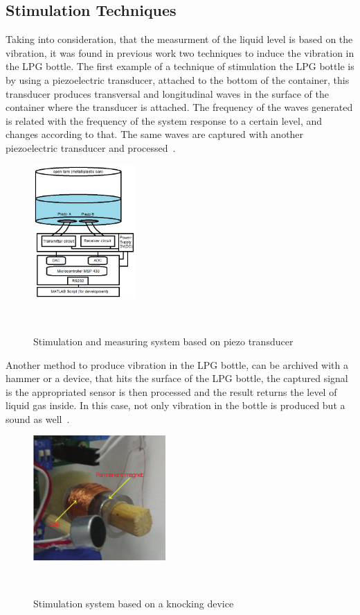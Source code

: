 \subsection{Stimulation Techniques}
Taking into consideration, that the measurment of the liquid level is based on the vibration, it was found in previous work two techniques to induce the vibration in the LPG bottle.
The first example of a technique of stimulation the LPG bottle is by using a piezoelectric transducer, attached to the bottom of the container, this transducer produces transversal and longitudinal waves in the surface of the container where the transducer is attached. The frequency of the waves generated is related with the frequency of the system response to a certain level, and changes according to that. The same waves are captured with another piezoelectric transducer and processed~\cite{jahnLevelSensorFluids2014a}.
\begin{figure}[]
    \centering
    \includegraphics[width=0.35\textwidth]{Chapters/2CHP/Diagrams/stimPiezo.eps}
    \caption{Stimulation and measuring system based on piezo transducer}{~\cite{jahnLevelSensorFluids2014a}}
    \label{fig:stimPiezo}
\end{figure}
Another method to produce vibration in the LPG bottle, can be archived with a hammer or a device, that hits the surface of the LPG bottle, the captured signal is the appropriated sensor is then processed and the result returns the level of liquid gas inside. In this case, not only vibration in the bottle is produced but a sound as well~\cite{wuAnalysisImplementationNoncontact2016a}.
\begin{figure}[]
    \centering
    \includegraphics[width=0.45\textwidth]{Chapters/2CHP/Diagrams/stimHammer.eps}
    \caption{Stimulation system based on a knocking device}{~\cite{wuAnalysisImplementationNoncontact2016a}}
    \label{fig:stimHammer}
\end{figure}

